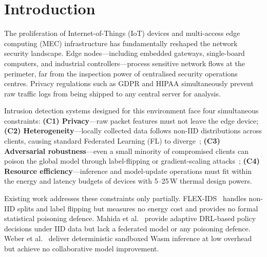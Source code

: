 \documentclass[sn-mathphys,Numbered]{sn-jnl}
\begin{document}

\maketitle

\section{Introduction}\label{sec:intro}

The proliferation of Internet-of-Things (IoT) devices and multi-access edge computing (MEC) infrastructure has fundamentally reshaped the network security landscape. Edge nodes---including embedded gateways, single-board computers, and industrial controllers---process sensitive network flows at the perimeter, far from the inspection power of centralised security operations centres. Privacy regulations such as GDPR and HIPAA simultaneously prevent raw traffic logs from being shipped to any central server for analysis.

Intrusion detection systems designed for this environment face four simultaneous constraints:
\textbf{(C1) Privacy}---raw packet features must not leave the edge device;
\textbf{(C2) Heterogeneity}---locally collected data follows non-IID distributions across clients, causing standard Federated Learning (FL) to diverge~\cite{li2020fedprox};
\textbf{(C3) Adversarial robustness}---even a small minority of compromised clients can poison the global model through label-flipping or gradient-scaling attacks~\cite{tolpegin2020};
\textbf{(C4) Resource efficiency}---inference and model-update operations must fit within the energy and latency budgets of devices with 5--25\,W thermal design powers.

Existing work addresses these constraints only partially. FLEX-IDS~\cite{flexids} handles non-IID splits and label flipping but measures no energy cost and provides no formal statistical poisoning defence. Mahida et al.~\cite{mahida2026} provide adaptive DRL-based policy decisions under IID data but lack a federated model or any poisoning defence. Weber et al.~\cite{weber2026} deliver deterministic sandboxed Wasm inference at low overhead but achieve no collaborative model improvement.
\end{document}
